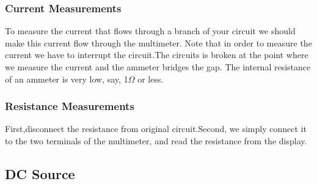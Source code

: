 \documentclass[12pt]{article}
\begin{document}
\subsubsection{Current Measurements}
To measure the current that flows through a branch of your circuit we should make this current flow through the multimeter. Note that in order to measure the current we have to interrupt the circuit.The circuits is broken at the point where we measure the current and the ammeter bridges the gap. The internal resistance of an ammeter is very low, say, 1$\Omega$ or less.
\subsubsection{Resistance Measurements}
First,disconnect the resistance from original circuit.Second, we simply connect it to the two terminals of the multimeter, and read the resistance from the display.
\subsection{DC Source}
\end{document}
